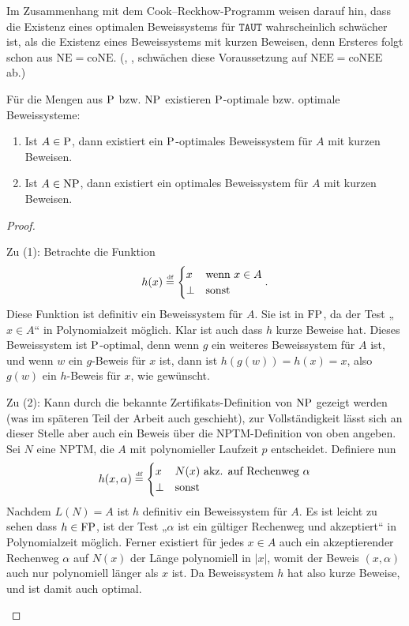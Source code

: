 Im Zusammenhang mit dem Cook–Reckhow-Programm weisen \textcite{krajicek_propositional_1989} darauf hin, dass die Existenz eines optimalen Beweissystems für $\mathtt{TAUT}$ wahrscheinlich schwächer ist, als die Existenz eines Beweissystems mit kurzen Beweisen, denn Ersteres folgt schon aus $\mathrm{NE}=\mathrm{coNE}$. (\citeauthor{kobler_optimal_2003}, \citeyear{kobler_optimal_2003}, schwächen diese Voraussetzung auf $\mathrm{NEE=coNEE}$ ab.)

Für die Mengen aus $\P$ bzw. $\NP$ existieren $\P$-optimale bzw. optimale Beweissysteme:
\begin{observation}\label{obs:np-short-ps}
    \begin{enumerate}
        \item Ist $A\in \P$, dann existiert ein $\P$-optimales Beweissystem für $A$ mit kurzen Beweisen.
        \item Ist $A\in \NP$, dann existiert ein optimales Beweissystem für $A$ mit kurzen Beweisen.
    \end{enumerate}
\end{observation}
\begin{proof}
\begin{prooflist}
\item Zu (1): Betrachte die Funktion
    \[ h(x) \defeq \begin{cases} x & \text{wenn $x\in A$} \\ \bot & \text{sonst} \end{cases}. \]
    Diese Funktion ist definitiv ein Beweissystem für $A$. Sie ist in $\FP$, da der Test „$x\in A$“ in Polynomialzeit möglich. Klar ist auch dass $h$ kurze Beweise hat. Dieses Beweissystem ist $\P$-optimal, denn wenn $g$ ein weiteres Beweissystem für $A$ ist, und wenn $w$ ein $g$-Beweis für $x$ ist, dann ist $h(g(w))=h(x)=x$, also $g(w)$ ein $h$-Beweis für $x$, wie gewünscht. 

\item Zu (2): Kann durch die bekannte Zertifikats-Definition von $\NP$ gezeigt werden (was im späteren Teil der Arbeit auch geschieht), zur Vollständigkeit lässt sich an dieser Stelle aber auch ein Beweis über die NPTM-Definition von oben angeben. Sei $N$ eine NPTM, die $A$ mit polynomieller Laufzeit $p$ entscheidet.
    Definiere nun
    \[ h(x, \alpha) \defeq \begin{cases} x & \text{$N(x)$ akz. auf Rechenweg $\alpha$} \\ \bot & \text{sonst} \end{cases} \]
    Nachdem $L(N)=A$ ist $h$ definitiv ein Beweissystem für $A$. Es ist leicht zu sehen dass $h\in\FP$, ist der Test „$\alpha$ ist ein gültiger Rechenweg und akzeptiert“ in Polynomialzeit möglich. Ferner existiert für jedes $x\in A$ auch ein akzeptierender Rechenweg $\alpha$ auf $N(x)$ der Länge polynomiell in $|x|$, womit der Beweis $(x, \alpha)$ auch nur polynomiell länger als $x$ ist. Da Beweissystem $h$ hat also kurze Beweise, und ist damit auch optimal.
\end{prooflist}
\end{proof}
